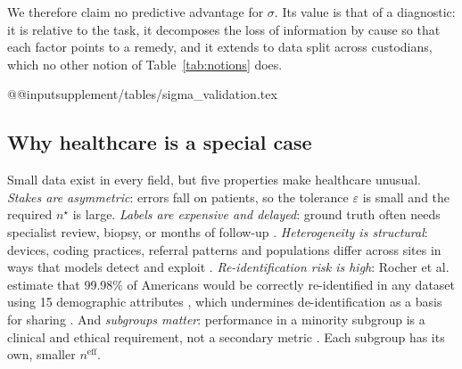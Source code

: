 \documentclass[acmsmall,screen,review]{acmart}
\newcommand{\eff}{\mathrm{eff}}
\theoremstyle{acmdefinition}
\begin{document}
We therefore claim no predictive advantage for $\sigma$. Its value is that of a diagnostic: it is relative to the task, it decomposes the loss of information by cause so that each factor points to a remedy, and it extends to data split across custodians, which no other notion of Table~\ref{tab:notions} does.

\begin{table}[!htbp]
\caption{Spearman correlation of each quantity with a hospital's gain from hierarchical borrowing over working alone (one minus the ratio of held-out log-losses), \SgHospOne{} hospitals of \SgNets{} networks, pooled and averaged within the \SgWithinNets{} networks with at least five hospitals. A predictor of the gain should correlate positively ($\sigma$) or negatively (the others). $D$: absolute correlation of $\sigma$ minus the largest absolute correlation of the others, with a 95\% cluster-bootstrap interval over networks. Per-hospital values are in the online supplement.}
\label{tab:sigma-test}
\footnotesize
\csname @@input\endcsname supplement/tables/sigma_validation.tex 
\end{table}

\subsection{Why healthcare is a special case}

Small data exist in every field, but five properties make healthcare unusual. \emph{Stakes are asymmetric}: errors fall on patients, so the tolerance $\varepsilon$ is small and the required $n^{\star}$ is large. \emph{Labels are expensive and delayed}: ground truth often needs specialist review, biopsy, or months of follow-up \cite{willemink2020preparing}. \emph{Heterogeneity is structural}: devices, coding practices, referral patterns and populations differ across sites in ways that models detect and exploit \cite{finlayson2021clinician,gichoya2022ai,zech2018variable}. \emph{Re-identification risk is high}: Rocher et al. estimate that 99.98\% of Americans would be correctly re-identified in any dataset using 15 demographic attributes \cite{rocher2019estimating}, which undermines de-identification as a basis for sharing \cite{price2019privacy,sweeney2002k}. And \emph{subgroups matter}: performance in a minority subgroup is a clinical and ethical requirement, not a secondary metric \cite{chen2021ethical,obermeyer2019dissecting}. Each subgroup has its own, smaller $n^{\eff}$.
\end{document}
